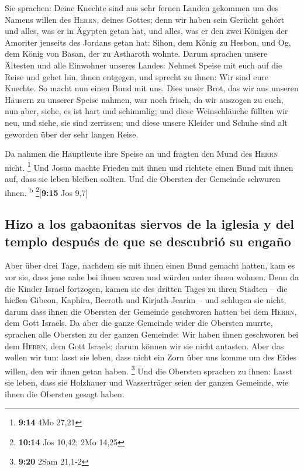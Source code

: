  Sie sprachen: Deine Knechte sind aus sehr fernen Landen
gekommen um des Namens willen des \textsc{Herrn}, deines Gottes; denn
wir haben sein Gerücht gehört und alles, was er in Ägypten getan hat,
 und alles, was er den zwei Königen der Amoriter jenseits
des Jordans getan hat: Sihon, dem König zu Hesbon, und Og, dem König von
Basan, der zu Astharoth wohnte.  Darum sprachen unsere
Ältesten und alle Einwohner unseres Landes: Nehmet Speise mit euch auf
die Reise und gehet hin, ihnen entgegen, und sprecht zu ihnen: Wir sind
eure Knechte. So macht nun einen Bund mit uns.  Dies
unser Brot, das wir aus unseren Häusern zu unserer Speise nahmen, war
noch frisch, da wir auszogen zu euch, nun aber, siehe, es ist hart und
schimmlig;  und diese Weinschläuche füllten wir neu, und
siehe, sie sind zerrissen; und diese unsere Kleider und Schuhe sind alt
geworden über der sehr langen Reise.

 Da nahmen die Hauptleute ihre Speise an und fragten den
Mund des \textsc{Herrn} nicht. \footnote{\textbf{9:14} 4Mo 27,21}
 Und Josua machte Frieden mit ihnen und richtete einen
Bund mit ihnen auf, dass sie leben bleiben sollten. Und die Obersten der
Gemeinde schwuren ihnen. \textsuperscript{b} \footnote{\textbf{10:14}
  Jos 10,42; 2Mo 14,25}{[}\textbf{9:15} Jos 9,7{]}

\hypertarget{hizo-a-los-gabaonitas-siervos-de-la-iglesia-y-del-templo-despuuxe9s-de-que-se-descubriuxf3-su-engauxf1o}{%
\subsection{Hizo a los gabaonitas siervos de la iglesia y del templo
después de que se descubrió su
engaño}\label{hizo-a-los-gabaonitas-siervos-de-la-iglesia-y-del-templo-despuuxe9s-de-que-se-descubriuxf3-su-engauxf1o}}

 Aber über drei Tage, nachdem sie mit ihnen einen Bund
gemacht hatten, kam es vor sie, dass jene nahe bei ihnen waren und
würden unter ihnen wohnen.  Denn da die Kinder Israel
fortzogen, kamen sie des dritten Tages zu ihren Städten -- die hießen
Gibeon, Kaphira, Beeroth und Kirjath-Jearim --  und
schlugen sie nicht, darum dass ihnen die Obersten der Gemeinde
geschworen hatten bei dem \textsc{Herrn}, dem Gott Israels. Da aber die
ganze Gemeinde wider die Obersten murrte,  sprachen alle
Obersten zu der ganzen Gemeinde: Wir haben ihnen geschworen bei dem
\textsc{Herrn}, dem Gott Israels; darum können wir sie nicht antasten.
 Aber das wollen wir tun: lasst sie leben, dass nicht ein
Zorn über uns komme um des Eides willen, den wir ihnen getan haben.
\footnote{\textbf{9:20} 2Sam 21,1-2}  Und die Obersten
sprachen zu ihnen: Lasst sie leben, dass sie Holzhauer und Wasserträger
seien der ganzen Gemeinde, wie ihnen die Obersten gesagt haben.

